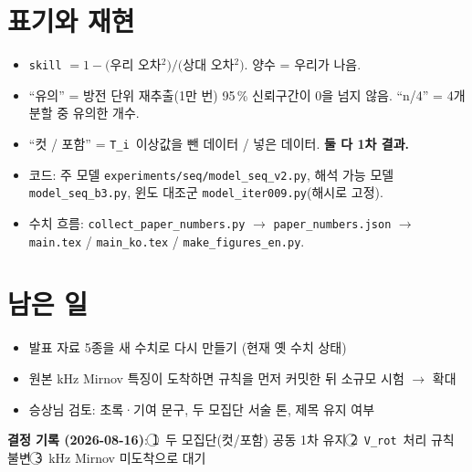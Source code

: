 \documentclass[10pt]{article}
\newcommand{\Ti}{\texttt{T\_i}}
\newcommand{\Vrot}{\texttt{V\_rot}}
\begin{document}
\appendix
\section{표기와 재현}

\begin{itemize}
\item \texttt{skill} $= 1 - ($우리 오차$^2) / ($상대 오차$^2)$. 양수 = 우리가 나음.
\item ``유의'' = 방전 단위 재추출(1만 번) 95\,\% 신뢰구간이 0을 넘지 않음.
  ``n/4'' = 4개 분할 중 유의한 개수.
\item ``컷 / 포함'' = \Ti\ 이상값을 뺀 데이터 / 넣은 데이터. \textbf{둘 다 1차 결과.}
\item 코드: 주 모델 \texttt{experiments/seq/model\_seq\_v2.py}, 해석 가능 모델
  \texttt{model\_seq\_b3.py}, 윈도 대조군 \texttt{model\_iter009.py}(해시로 고정).
\item 수치 흐름: \texttt{collect\_paper\_numbers.py} $\rightarrow$
  \texttt{paper\_numbers.json} $\rightarrow$ \texttt{main.tex} / \texttt{main\_ko.tex} /
  \texttt{make\_figures\_en.py}.
\end{itemize}

\section{남은 일}

\begin{itemize}
\item[$\square$] 발표 자료 5종을 새 수치로 다시 만들기 (현재 옛 수치 상태)
\item[$\square$] 원본 kHz Mirnov 특징이 도착하면 규칙을 먼저 커밋한 뒤 소규모 시험
  $\rightarrow$ 확대
\item[$\square$] 승상님 검토: 초록·기여 문구, 두 모집단 서술 톤, 제목 유지 여부
\end{itemize}

\textbf{결정 기록 (2026-08-16)}:
\textcircled{1}~두 모집단(컷/포함) 공동 1차 유지 \quad
\textcircled{2}~\Vrot\ 처리 규칙 불변 \quad
\textcircled{3}~kHz Mirnov 미도착으로 대기
\end{document}
